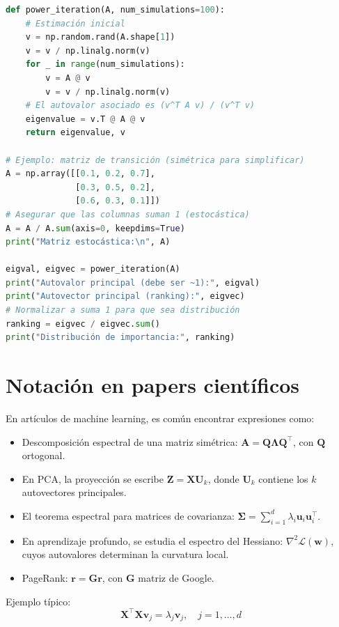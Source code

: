 \documentclass[12pt,a4paper,openany,oneside]{book}
\begin{document}
\begin{lstlisting}[language=Python]
def power_iteration(A, num_simulations=100):
    # Estimación inicial
    v = np.random.rand(A.shape[1])
    v = v / np.linalg.norm(v)
    for _ in range(num_simulations):
        v = A @ v
        v = v / np.linalg.norm(v)
    # El autovalor asociado es (v^T A v) / (v^T v)
    eigenvalue = v.T @ A @ v
    return eigenvalue, v

# Ejemplo: matriz de transición (simétrica para simplificar)
A = np.array([[0.1, 0.2, 0.7],
              [0.3, 0.5, 0.2],
              [0.6, 0.3, 0.1]])
# Asegurar que las columnas suman 1 (estocástica)
A = A / A.sum(axis=0, keepdims=True)
print("Matriz estocástica:\n", A)

eigval, eigvec = power_iteration(A)
print("Autovalor principal (debe ser ~1):", eigval)
print("Autovector principal (ranking):", eigvec)
# Normalizar a suma 1 para que sea distribución
ranking = eigvec / eigvec.sum()
print("Distribución de importancia:", ranking)
\end{lstlisting}

\section{Notación en papers científicos}

En artículos de machine learning, es común encontrar expresiones como:

\begin{itemize}
    \item Descomposición espectral de una matriz simétrica: $\mathbf{A} = \mathbf{Q} \mathbf{\Lambda} \mathbf{Q}^\top$, con $\mathbf{Q}$ ortogonal.
    \item En PCA, la proyección se escribe $\mathbf{Z} = \mathbf{X} \mathbf{U}_k$, donde $\mathbf{U}_k$ contiene los $k$ autovectores principales.
    \item El teorema espectral para matrices de covarianza: $\boldsymbol{\Sigma} = \sum_{i=1}^d \lambda_i \mathbf{u}_i \mathbf{u}_i^\top$.
    \item En aprendizaje profundo, se estudia el espectro del Hessiano: $\nabla^2 \mathcal{L}(\mathbf{w})$, cuyos autovalores determinan la curvatura local.
    \item PageRank: $\mathbf{r} = \mathbf{G} \mathbf{r}$, con $\mathbf{G}$ matriz de Google.
\end{itemize}

Ejemplo típico:
\[
\mathbf{X}^\top \mathbf{X} \mathbf{v}_j = \lambda_j \mathbf{v}_j, \quad j=1,\dots,d
\]
\end{document}
